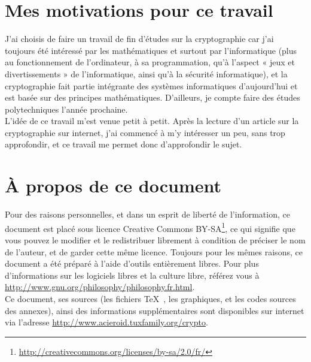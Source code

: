 
\section{Mes motivations pour ce travail}
J'ai choisis de faire un travail de fin d'études sur la cryptographie
car j'ai toujours été intéressé par les mathématiques et surtout par
l'informatique (plus au fonctionnement de l'ordinateur, à sa
programmation, qu'à l'aspect « jeux et divertissements » de
l'informatique, ainsi qu'à la sécurité informatique), 
et la cryptographie fait partie intégrante des
systèmes informatiques d'aujourd'hui et est basée sur des principes
mathématiques. D'ailleurs, je compte faire des études polytechniques
l'année prochaine. \\ L'idée de ce travail m'est venue petit à
petit. Après la lecture d'un article sur la cryptographie sur
internet, j'ai commencé à m'y intéresser un peu, sans trop
approfondir, et ce travail me permet donc d'approfondir le sujet.

\section{À propos de ce document}
Pour des raisons personnelles, et dans un esprit de liberté de
l'information, ce document est placé sous licence Creative Commons
BY-SA\footnote{\url{http://creativecommons.org/licenses/by-sa/2.0/fr/}}, ce qui
signifie que vous pouvez le modifier et le redistribuer librement à
condition de préciser le nom de l'auteur, et de garder cette même
licence. Toujours pour les mêmes raisons, ce document a été préparé à
l'aide d'outils entièrement libres.
Pour plus d'informations sur les logiciels libres et la culture
libre, référez vous à \url{http://www.gnu.org/philosophy/philosophy.fr.html}. \\
Ce document, ses sources (les fichiers \TeX~, les graphiques, et les
codes sources des annexes), ainsi des informations supplémentaires
sont disponibles sur internet via l'adresse
\url{http://www.acieroid.tuxfamily.org/crypto}. \\


